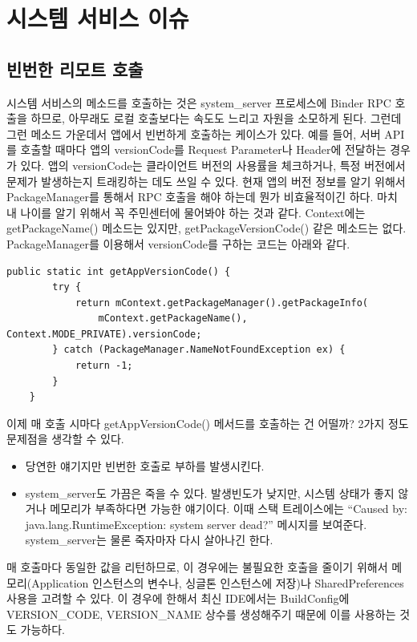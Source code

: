 \section{시스템 서비스 이슈}
\subsection{빈번한 리모트 호출}
시스템 서비스의 메소드를 호출하는 것은 system\_server 프로세스에 Binder RPC 호출을 하므로, 아무래도 로컬 호출보다는 속도도 느리고 자원을 소모하게 된다.
그런데 그런 메소드 가운데서 앱에서 빈번하게 호출하는 케이스가 있다.
예를 들어, 서버 API를 호출할 때마다 앱의 versionCode를 Request Parameter나 Header에 전달하는 경우가 있다. 
앱의 versionCode는 클라이언트 버전의 사용률을 체크하거나, 특정 버전에서 문제가 발생하는지 트래킹하는 데도 쓰일 수 있다.
현재 앱의 버전 정보를 알기 위해서 PackageManager를 통해서 RPC 호출을 해야 하는데 뭔가 비효율적이긴 하다. 
마치 내 나이를 알기 위해서 꼭 주민센터에 물어봐야 하는 것과 같다.
Context에는 getPackageName() 메소드는 있지만, getPackageVersionCode() 같은 메소드는 없다.\\

PackageManager를 이용해서 versionCode를 구하는 코드는 아래와 같다.
\begin{lstlisting}[frame=single]
	public static int getAppVersionCode() {
		try {
			return mContext.getPackageManager().getPackageInfo(
				mContext.getPackageName(), Context.MODE_PRIVATE).versionCode;
		} catch (PackageManager.NameNotFoundException ex) {
			return -1;
		}
	}
\end{lstlisting}

이제 매 호출 시마다 getAppVersionCode() 메서드를 호출하는 건 어떨까?
2가지 정도 문제점을 생각할 수 있다.
\begin{itemize}
\item 당연한 얘기지만 빈번한 호출로 부하를 발생시킨다.
\item system\_server도  가끔은 죽을 수 있다. 
발생빈도가 낮지만, 시스템 상태가 좋지 않거나 메모리가 부족하다면 가능한 얘기이다. 이때 스택 트레이스에는 ``Caused by: java.lang.RuntimeExce\-ption: system server dead?'' 메시지를 보여준다. system\_server는 물론 죽자마자 다시 살아나긴 한다.
\end{itemize}

매 호출마다 동일한 값을 리턴하므로, 이 경우에는 불필요한 호출을 줄이기 위해서 메모리(Application 인스턴스의 변수나, 싱글톤 인스턴스에 저장)나 SharedPreferences 사용을 고려할 수 있다. 이 경우에 한해서 최신 IDE에서는 BuildConfig에 VERSION\_CODE, VERSION\_NAME 상수를 생성해주기 때문에 이를 사용하는 것도 가능하다.\\

